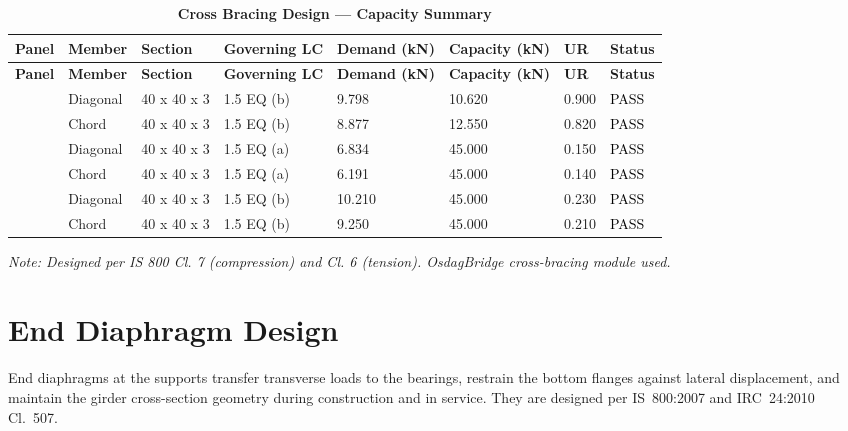 \documentclass[12pt,a4paper]{report}
\numberwithin{table}{chapter}
\numberwithin{figure}{chapter}
\begin{document}
\vspace{1em}
\begin{longtable}{|C{2.0cm}|L{1.8cm}|C{2.2cm}|C{3.0cm}|C{1.8cm}|C{1.8cm}|C{1.2cm}|C{1.8cm}|}
\caption{\textbf{Cross Bracing Design --- Capacity Summary}}
\hline
\textbf{Panel} & \textbf{Member} & \textbf{Section} & \textbf{Governing LC} & \textbf{Demand (kN)} & \textbf{Capacity (kN)} & \textbf{UR} & \textbf{Status} \\[6pt]
\hline
\endfirsthead

\hline

\textbf{Panel} & \textbf{Member} & \textbf{Section} & \textbf{Governing LC} & \textbf{Demand (kN)} & \textbf{Capacity (kN)} & \textbf{UR} & \textbf{Status} \\[6pt]

\hline

\endhead
{} & Diagonal & 40 x 40 x 3 & 1.5 EQ (b) & 9.798 & 10.620 & 0.900 & \textcolor{black}{PASS} \\[6pt]
 & Chord & 40 x 40 x 3 & 1.5 EQ (b) & 8.877 & 12.550 & 0.820 & \textcolor{black}{PASS} \\[6pt]
\hline
{} & Diagonal & 40 x 40 x 3 & 1.5 EQ (a) & 6.834 & 45.000 & 0.150 & \textcolor{black}{PASS} \\[6pt]
 & Chord & 40 x 40 x 3 & 1.5 EQ (a) & 6.191 & 45.000 & 0.140 & \textcolor{black}{PASS} \\[6pt]
\hline
{} & Diagonal & 40 x 40 x 3 & 1.5 EQ (b) & 10.210 & 45.000 & 0.230 & \textcolor{black}{PASS} \\[6pt]
 & Chord & 40 x 40 x 3 & 1.5 EQ (b) & 9.250 & 45.000 & 0.210 & \textcolor{black}{PASS} \\[6pt]
\hline
\end{longtable}
\noindent\textit{Note: Designed per IS 800 Cl. 7 (compression) and Cl. 6 (tension). OsdagBridge cross-bracing module used.}

\section{End Diaphragm Design}
\label{sec:end-diaphragm}

End diaphragms at the supports transfer transverse loads to the bearings, restrain the bottom flanges against lateral displacement, and maintain the girder cross-section geometry during construction and in service. They are designed per IS~800:2007 and IRC~24:2010 Cl.~507.
\newpage
\vspace{1em}
\end{document}

